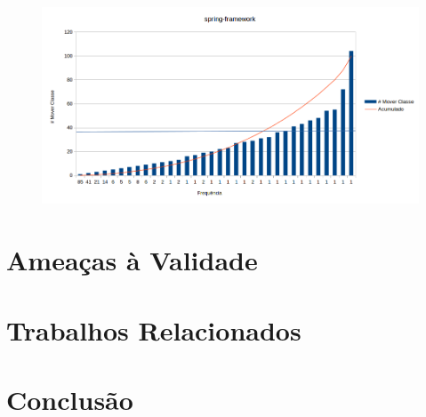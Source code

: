 \documentclass[12pt]{article}
\begin{document}
\begin{figure}
	\centering
	\includegraphics[width=0.9\linewidth]{../img/results-spring}
	\caption[Frequência de Mover Classe]{}
	\label{fig:resultado-spring}
\end{figure}




\section{Ameaças à Validade}
\label{sec:ameacas}

\section{Trabalhos Relacionados}
\label{sec:trabalhos-relacionados}

\section{Conclusão}
\label{sec:conclusao}


\end{document}

